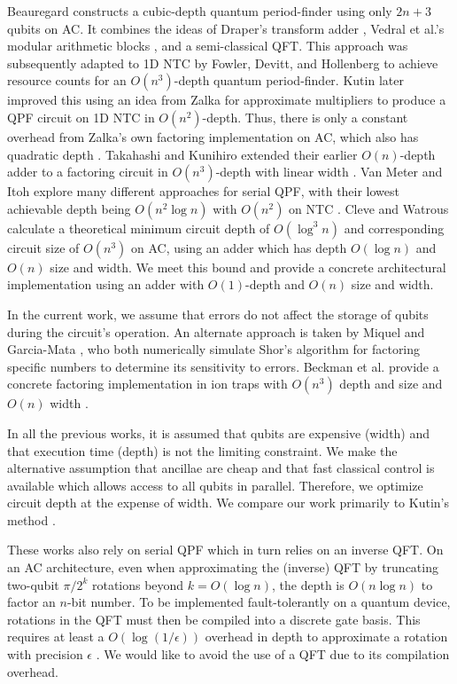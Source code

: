 Beauregard \cite{Beauregard2002}
constructs a cubic-depth quantum period-finder using only $2n+3$ qubits on
\textsc{AC}.
It combines the ideas of Draper's transform adder \cite{Draper2000},
Vedral et al.'s modular arithmetic blocks \cite{Vedral1996}, and a
semi-classical QFT.
This approach was subsequently adapted to \textsc{1D NTC} by Fowler, Devitt,
and Hollenberg
\cite{Fowler2004} to achieve resource counts for an $O(n^3)$-depth
quantum period-finder. Kutin \cite{Kutin2006} later improved this using
an idea from Zalka for approximate multipliers to produce a QPF circuit on
\textsc{1D NTC}
in $O(n^2)$-depth. Thus, there is only a constant overhead from
Zalka's own factoring implementation on \textsc{AC}, which also has
quadratic depth \cite{Zalka1998}.
Takahashi and Kunihiro extended their earlier $O(n)$-depth adder to a factoring
circuit in $O(n^3)$-depth with linear width \cite{Takahashi2006}.
Van Meter and Itoh explore many different approaches for serial QPF,
with their lowest achievable depth being $O(n^2\log n)$ with
$O(n^2)$ on \textsc{NTC} \cite{VanMeter2005}. Cleve and Watrous
calculate a theoretical minimum circuit depth of $O(\log^3 n)$ and corresponding
circuit size of $O(n^3)$ on \textsc{AC},
using an adder which has depth $O(\log n)$ and
$O(n)$ size and width. We meet this bound and provide a concrete
architectural implementation using an adder with $O(1)$-depth and $O(n)$
size and width.

In the current work, we assume that errors do not affect the storage of qubits
during the circuit's operation. An alternate approach is taken by
Miquel \cite{Miquel1996} and Garcia-Mata \cite{GarciaMata2007}, who both
numerically simulate Shor's algorithm for factoring specific
numbers to determine its sensitivity to errors. Beckman et al. provide a
concrete factoring implementation in ion traps with $O(n^3)$ depth and size and
$O(n)$ width \cite{Beckman1996}.

In all the previous works,
it is assumed that qubits are expensive (width) and that
execution time (depth) is not the limiting constraint.
We make the alternative assumption that ancillae are cheap and that fast classical control
is available which allows access to all qubits in parallel.
Therefore, we optimize circuit depth at the expense of width.
We compare our work primarily to Kutin's method \cite{Kutin2006}.

These works also rely on serial QPF which in turn relies on an inverse QFT.
On an AC architecture, even when approximating the (inverse) QFT by truncating two-qubit
$\pi/2^k$ rotations beyond $k = O(\log n)$, 
the depth is $O(n \log n)$ to factor an $n$-bit number.
To be implemented fault-tolerantly on a quantum device, rotations in the QFT must then be compiled into a discrete gate basis.
This requires at least a $O(\log(1/\epsilon))$ overhead in depth to approximate a rotation with precision $\epsilon$ \cite{Harrow02, Kitaev2002}.
We would like to avoid the use of a QFT due to its compilation overhead.

